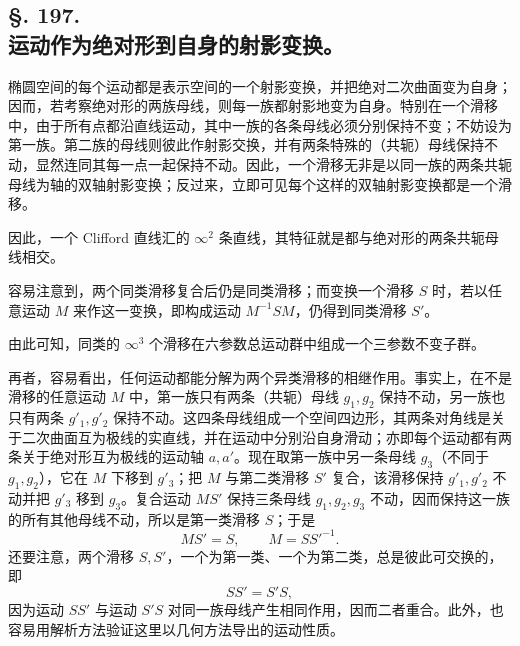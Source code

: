 \subsection*{§. 197.\\ 运动作为绝对形到自身的射影变换。}

椭圆空间的每个运动都是表示空间的一个射影变换，并把绝对二次曲面变为自身；因而，若考察绝对形的两族母线，则每一族都射影地变为自身。特别在一个滑移中，由于所有点都沿直线运动，其中一族的各条母线必须分别保持不变；不妨设为第一族。第二族的母线则彼此作射影交换，并有两条特殊的（共轭）母线保持不动，显然连同其每一点一起保持不动。因此，一个滑移无非是以同一族的两条共轭母线为轴的双轴射影变换；反过来，立即可见每个这样的双轴射影变换都是一个滑移。

因此，一个 Clifford 直线汇的 $\infty^2$ 条直线，其特征就是都与绝对形的两条共轭母线相交。

容易注意到，两个同类滑移复合后仍是同类滑移；而变换一个滑移 $S$ 时，若以任意运动 $M$ 来作这一变换，即构成运动 $M^{-1}SM$，仍得到同类滑移 $S'$。

由此可知，同类的 $\infty^3$ 个滑移在六参数总运动群中组成一个三参数不变子群。

再者，容易看出，任何运动都能分解为两个异类滑移的相继作用。事实上，在不是滑移的任意运动 $M$ 中，第一族只有两条（共轭）母线 $g_1,g_2$ 保持不动，另一族也只有两条 $g'_1,g'_2$ 保持不动。这四条母线组成一个空间四边形，其两条对角线是关于二次曲面互为极线的实直线，并在运动中分别沿自身滑动；亦即每个运动都有两条关于绝对形互为极线的运动轴 $a,a'$。现在取第一族中另一条母线 $g_3$（不同于 $g_1,g_2$），它在 $M$ 下移到 $g'_3$；把 $M$ 与第二类滑移 $S'$ 复合，该滑移保持 $g'_1,g'_2$ 不动并把 $g'_3$ 移到 $g_3$。复合运动 $MS'$ 保持三条母线 $g_1,g_2,g_3$ 不动，因而保持这一族的所有其他母线不动，所以是第一类滑移 $S$；于是
\[
 MS'=S,
 \qquad M=SS'^{-1}.
\]
还要注意，两个滑移 $S,S'$，一个为第一类、一个为第二类，总是彼此可交换的，即
\[
 SS'=S'S,
\]
因为运动 $SS'$ 与运动 $S'S$ 对同一族母线产生相同作用，因而二者重合。此外，也容易用解析方法验证这里以几何方法导出的运动性质。
